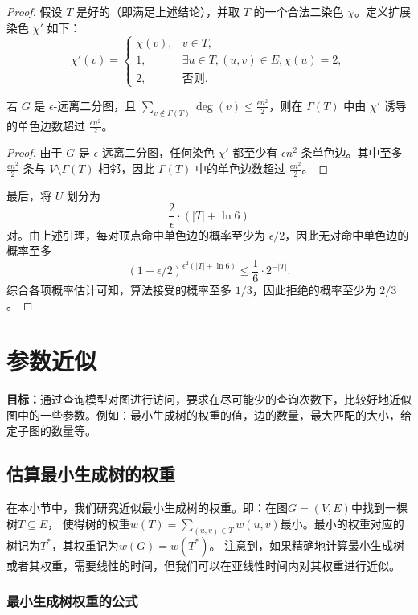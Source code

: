 \begin{proof}
假设 $T$ 是好的（即满足上述结论），并取 $T$ 的一个合法二染色 $\chi$。定义扩展染色 $\chi'$ 如下：
$$
\chi'(v) =
\begin{cases}
\chi(v), & v \in T, \\
1, & \exists u \in T, (u,v) \in E, \chi(u) = 2, \\
2, & \text{否则}.
\end{cases}
$$

\begin{claim}
若 $G$ 是 $\epsilon$-远离二分图，且 $\sum_{v \notin \Gamma(T)} \deg(v) \le \frac{\epsilon n^2}{2}$，则在 $\Gamma(T)$ 中由 $\chi'$ 诱导的单色边数超过 $\frac{\epsilon n^2}{2}$。
\end{claim}

\begin{proof}
由于 $G$ 是 $\epsilon$-远离二分图，任何染色 $\chi'$ 都至少有 $\epsilon n^2$ 条单色边。其中至多 $\frac{\epsilon n^2}{2}$ 条与 $V \setminus \Gamma(T)$ 相邻，因此 $\Gamma(T)$ 中的单色边数超过 $\frac{\epsilon n^2}{2}$。
\end{proof}

最后，将 $U$ 划分为
$$
\frac{2}{\epsilon} \cdot \left(|T| + \ln 6\right)
$$
对。由上述引理，每对顶点命中单色边的概率至少为 $\epsilon/2$，因此无对命中单色边的概率至多
$$
(1 - \epsilon/2)^{\epsilon^2 (|T| + \ln 6)} \le \frac{1}{6} \cdot 2^{-|T|}.
$$
综合各项概率估计可知，算法接受的概率至多 $1/3$，因此拒绝的概率至少为 $2/3$。
\end{proof}

\section{参数近似}
\textbf{目标：}通过查询模型对图进行访问，要求在尽可能少的查询次数下，比较好地近似图中的一些参数。例如：最小生成树的权重的值，边的数量，最大匹配的大小，给定子图的数量等。

\subsection{估算最小生成树的权重}
在本小节中，我们研究近似最小生成树的权重。即：在图$G=(V,E)$中找到一棵树$T\subseteq E$，
使得树的权重$w(T)=\sum_{(u,v)\in T}w(u,v)$最小。最小的权重对应的树记为$T^*$，其权重记为$w(G)=w(T^*)$。
注意到，如果精确地计算最小生成树或者其权重，需要线性的时间，但我们可以在亚线性时间内对其权重进行近似。

\subsubsection{最小生成树权重的公式}

